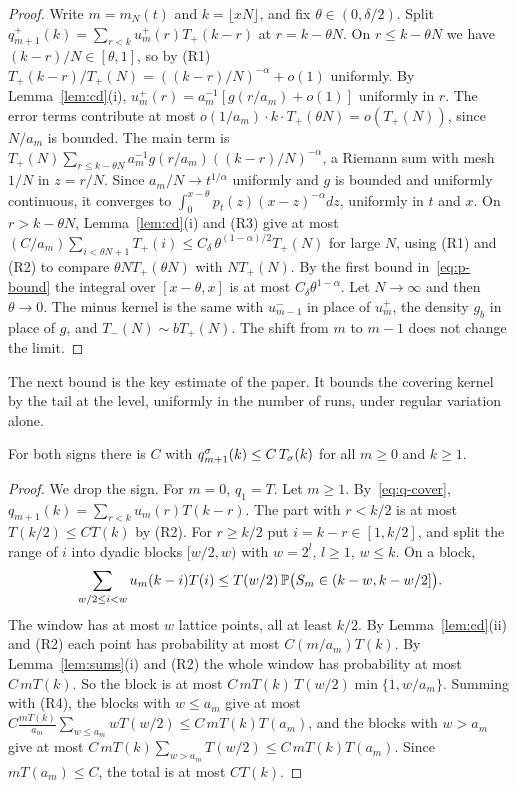 \begin{proof}
Write $m=m_N(t)$ and $k=\lfloor xN\rfloor$, and fix $\theta\in(0,\delta/2)$. Split
$q^\plus_{m+1}(k)=\sum_{r<k}u^\plus_m(r)T_\plus(k-r)$ at $r=k-\theta N$. On
$r\le k-\theta N$ we have $(k-r)/N\in[\theta,1]$, so by (R1)
$T_\plus(k-r)/T_\plus(N)=((k-r)/N)^{-\alpha}+o(1)$ uniformly. By
Lemma~\ref{lem:cd}(i), $u^\plus_m(r)=a_m^{-1}[g(r/a_m)+o(1)]$ uniformly in $r$. The error
terms contribute at most $o(1/a_m)\cdot k\cdot T_\plus(\theta N)=o(T_\plus(N))$, since
$N/a_m$ is bounded. The main term is
$T_\plus(N)\sum_{r\le k-\theta N}a_m^{-1}g(r/a_m)((k-r)/N)^{-\alpha}$, a Riemann sum with mesh
$1/N$ in $z=r/N$. Since $a_m/N\to t^{1/\alpha}$ uniformly and $g$ is bounded and uniformly
continuous, it converges to $\int_0^{x-\theta}p_t(z)(x-z)^{-\alpha}dz$, uniformly in
$t$ and $x$. On $r>k-\theta N$, Lemma~\ref{lem:cd}(i) and (R3) give at most
$(C/a_m)\sum_{i<\theta N+1}T_\plus(i)\le C_\delta\,\theta^{(1-\alpha)/2}T_\plus(N)$ for large
$N$, using (R1) and (R2) to compare $\theta NT_\plus(\theta N)$ with $NT_\plus(N)$. By the
first bound in~\eqref{eq:p-bound} the integral over $[x-\theta,x]$ is at most
$C_\delta\theta^{1-\alpha}$. Let $N\to\infty$ and then $\theta\to0$. The minus kernel is the
same with $u^\minus_{m-1}$ in place of $u^\plus_m$, the density $g_b$ in place of $g$,
and $T_\minus(N)\sim bT_\plus(N)$. The shift from $m$ to $m-1$ does not change the
limit.
\end{proof}

The next bound is the key estimate of the paper. It bounds the covering kernel by
the tail at the level, uniformly in the number of runs, under regular variation
alone.

\begin{lemma}\label{lem:key}
For both signs there is $C$ with $q^\sigma_{m+1}(k)\le C\,T_\sigma(k)$ for all $m\ge0$ and
$k\ge1$.
\end{lemma}

\begin{proof}
We drop the sign. For $m=0$, $q_1=T$. Let $m\ge1$. By~\eqref{eq:q-cover},
$q_{m+1}(k)=\sum_{r<k}u_m(r)T(k-r)$. The part with $r<k/2$ is at most
$T(k/2)\le CT(k)$ by (R2). For $r\ge k/2$ put $i=k-r\in[1,k/2]$, and split the range
of $i$ into dyadic blocks $[w/2,w)$ with $w=2^l$, $l\ge1$, $w\le k$. On a block,
\[
 \sum_{w/2\le i<w}u_m(k-i)T(i)\le T(w/2)\,\mathbb{P}\bigl(S_m\in(k-w,k-w/2]\bigr).
\]
The window has at most $w$ lattice points, all at least $k/2$. By
Lemma~\ref{lem:cd}(ii) and (R2) each point has probability at most
$C(m/a_m)T(k)$. By Lemma~\ref{lem:sums}(i) and (R2) the whole window has probability
at most $C\,mT(k)$. So the block is at most
$C\,mT(k)\,T(w/2)\min\{1,w/a_m\}$. Summing with (R4), the blocks with $w\le a_m$ give
at most $C\frac{mT(k)}{a_m}\sum_{w\le a_m}wT(w/2)\le C\,mT(k)T(a_m)$, and the blocks
with $w>a_m$ give at most $C\,mT(k)\sum_{w>a_m}T(w/2)\le C\,mT(k)T(a_m)$. Since
$mT(a_m)\le C$, the total is at most $CT(k)$.
\end{proof}

